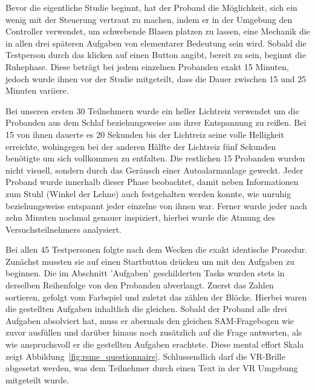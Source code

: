 Bevor die eigentliche Studie beginnt, hat der Proband die Möglichkeit, sich ein wenig mit der Steuerung vertraut zu machen, indem er in der Umgebung den Controller verwendet, um schwebende Blasen platzen zu lassen, eine Mechanik die in allen drei späteren Aufgaben von elementarer Bedeutung sein wird. Sobald die Testperson durch das klicken auf einen Button angibt, bereit zu sein, beginnt die Ruhephase. Diese beträgt bei jedem einzelnen Probanden exakt 15 Minuten, jedoch wurde ihnen vor der Studie mitgeteilt, dass die Dauer zwischen 15 und 25 Minuten variiere.

Bei unseren ersten 30 Teilnehmern wurde ein heller Lichtreiz verwendet um die Probanden aus dem Schlaf beziehungsweise aus ihrer Entspannung zu reißen. Bei 15 von ihnen dauerte es 20 Sekunden bis der Lichtreiz seine volle Helligkeit erreichte, wohingegen bei der anderen Hälfte der Lichtreiz fünf Sekunden benötigte um sich vollkommen zu entfalten. Die restlichen 15 Probanden wurden nicht visuell, sondern durch das Geräusch einer Autoalarmanlage geweckt. Jeder Proband wurde innerhalb dieser Phase beobachtet, damit neben Informationen zum Stuhl (Winkel der Lehne) auch festgehalten werden konnte, wie unruhig beziehungsweise entspannt jeder einzelne von ihnen war. Ferner wurde jeder nach zehn Minuten nochmal genauer inspiziert, hierbei wurde die Atmung des Versuchsteilnehmers analysiert.

Bei allen 45 Testpersonen folgte nach dem Wecken die exakt identische Prozedur. Zunächst mussten sie auf einen Startbutton drücken um mit den Aufgaben zu beginnen. Die im Abschnitt 'Aufgaben' geschilderten Tasks wurden stets in derselben Reihenfolge von den Probanden abverlangt. Zuerst das Zahlen sortieren, gefolgt vom Farbspiel und zuletzt das zählen der Blöcke. Hierbei waren die gestellten Aufgaben inhaltlich die gleichen. %
Sobald der Proband alle drei Aufgaben absolviert hat, muss er abermals den gleichen SAM-Fragebogen wie zuvor ausfüllen und darüber hinaus noch zusätzlich auf die Frage antworten, als wie anspruchsvoll er die gestellten Aufgaben erachtete. Diese mental effort Skala zeigt Abbildung~\ref{fig:rsme_questionnaire}. Schlussendlich darf die VR-Brille abgesetzt werden, was dem Teilnehmer durch einen Text in der VR Umgebung mitgeteilt wurde.

